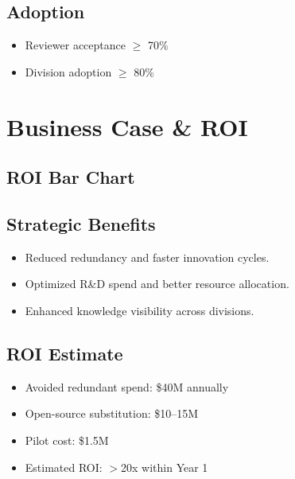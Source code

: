 \documentclass[12pt,a4paper]{article}
\begin{document}
\subsection{Adoption}
\begin{itemize}[leftmargin=2em]
    \item Reviewer acceptance $\geq$ 70\%  
    \item Division adoption $\geq$ 80\%  
\end{itemize}

\section{Business Case \& ROI}
\subsection{ROI Bar Chart}

\begin{center}
\end{center}

\subsection{Strategic Benefits}
\begin{itemize}[leftmargin=2em]
    \item Reduced redundancy and faster innovation cycles.  
    \item Optimized R\&D spend and better resource allocation.  
    \item Enhanced knowledge visibility across divisions.  
\end{itemize}

\subsection{ROI Estimate}
\begin{itemize}[leftmargin=2em]
    \item Avoided redundant spend: \$40M annually  
    \item Open-source substitution: \$10--15M  
    \item Pilot cost: \$1.5M  
    \item Estimated ROI: $>$20x within Year 1  
\end{itemize}
\end{document}
